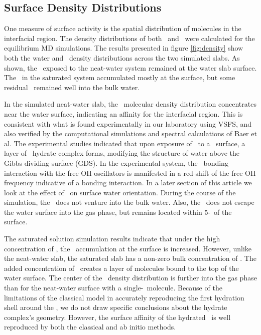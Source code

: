 \subsection{Surface Density Distributions}

One measure of surface activity is the spatial distribution of molecules in the interfacial region. The density distributions of both \wat~and \suldiox~were calculated for the equilibrium MD simulations. The results presented in figure \ref{fig:density} show both the water and \suldiox~density distributions across the two simulated slabs. As shown, the \suldiox~exposed to the neat-water system remained at the water slab surface. The \suldiox~in the saturated system accumulated mostly at the surface, but some residual \suldiox~remained well into the bulk water.



In the simulated neat-water slab, the \suldiox~molecular density distribution concentrates near the water surface, indicating an affinity for the interfacial region. This is consistent with what is found experimentally in our laboratory using VSFS,\cite{Tarbuck2005,Tarbuck2006} and also verified by the computational simulations and spectral calculations of Baer et al.\cite{Baer2010} The experimental studies indicated that upon exposure of \suldiox~to a \wat~surface, a layer of \suldiox~hydrate complex forms, modifying the structure of water above the Gibbs dividing surface (GDS). In the experimental system, the \suldiox~bonding interaction with the free OH oscillators is manifested in a red-shift of the free OH frequency indicative of a bonding interaction. In a later section of this article we look at the effect of \suldiox~on surface water orientation.  During the course of the simulation, the \suldiox~does not venture into the bulk water. Also, the \suldiox~does not escape the water surface into the gas phase, but remains located within 5-\angs~of the surface. 

The saturated solution simulation results indicate that under the high concentration of \suldiox, the \suldiox~accumulation at the surface is increased. However, unlike the neat-water slab, the saturated slab has a non-zero bulk concentration of \suldiox. The added concentration of \suldiox~creates a layer of molecules bound to the top of the water surface. The center of the \suldiox~density distribution is further into the gas phase than for the neat-water surface with a single-\suldiox~molecule. Because of the limitations of the classical model in accurately reproducing the first hydration shell around the \suldiox,\cite{Baer2010} we do not draw specific conclusions about the hydrate complex's geometry. However, the surface affinity of the hydrated \suldiox~is well reproduced by both the classical and ab initio methods.

